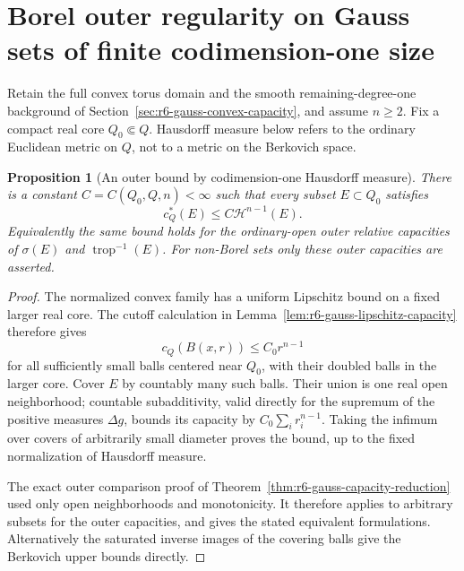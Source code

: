 \documentclass[11pt,a4paper]{article}
\numberwithin{equation}{section}
\newtheorem{proposition}[theorem]{Proposition}
\theoremstyle{definition}
\theoremstyle{remark}
\begin{document}


\section{Borel outer regularity on Gauss sets of finite codimension-one size}
\label{sec:r6-gauss-finite-size-regularity}

Retain the full convex torus domain and the smooth remaining-degree-one
background of Section~\ref{sec:r6-gauss-convex-capacity}, and assume
$n\ge2$. Fix a compact real core $Q_0\Subset Q$. Hausdorff measure
below refers to the ordinary Euclidean metric on $Q$, not to a metric
on the Berkovich space.

\begin{proposition}[An outer bound by codimension-one Hausdorff measure]
\label{prop:r6-gauss-hausdorff-outer-bound}
There is a constant $C=C(Q_0,Q,n)<\infty$ such that every subset
$E\subset Q_0$ satisfies
\[
                 c_Q^*(E)\le C\mathcal H^{n-1}(E).
\]
Equivalently the same bound holds for the ordinary-open outer relative
capacities of $\sigma(E)$ and $\operatorname{trop}^{-1}(E)$.
For non-Borel sets only these outer capacities are asserted.
\end{proposition}

\begin{proof}
The normalized convex family has a uniform Lipschitz bound on a fixed
larger real core. The cutoff calculation in
Lemma~\ref{lem:r6-gauss-lipschitz-capacity} therefore gives
\[
                   c_Q(B(x,r))\le C_0r^{n-1}
\]
for all sufficiently small balls centered near $Q_0$, with their
doubled balls in the larger core. Cover $E$ by countably many such
balls. Their union is one real open neighborhood; countable
subadditivity, valid directly for the supremum of the positive
measures $\Delta g$, bounds its capacity by
$C_0\sum_i r_i^{n-1}$. Taking the infimum over covers of arbitrarily
small diameter proves the bound, up to the fixed normalization of
Hausdorff measure.

The exact outer comparison proof of
Theorem~\ref{thm:r6-gauss-capacity-reduction} used only open
neighborhoods and monotonicity. It therefore applies to arbitrary
subsets for the outer capacities, and gives the stated equivalent
formulations. Alternatively the saturated inverse images of the
covering balls give the Berkovich upper bounds directly.
\end{proof}
\end{document}
